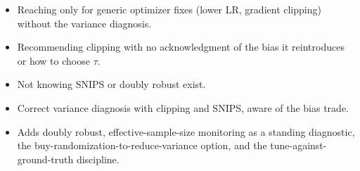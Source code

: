 \begin{interviewq}
\redflags
\begin{itemize}
    \item Reaching only for generic optimizer fixes (lower LR, gradient clipping) without the variance diagnosis.
    \item Recommending clipping with no acknowledgment of the bias it reintroduces or how to choose $\tau$.
    \item Not knowing SNIPS or doubly robust exist.
\end{itemize}


\goodgreat
\begin{itemize}
    \item {} Correct variance diagnosis with clipping and SNIPS, aware of the bias trade.
    \item {} Adds doubly robust, effective-sample-size monitoring as a standing diagnostic, the buy-randomization-to-reduce-variance option, and the tune-against-ground-truth discipline.
\end{itemize}

\end{interviewq}
